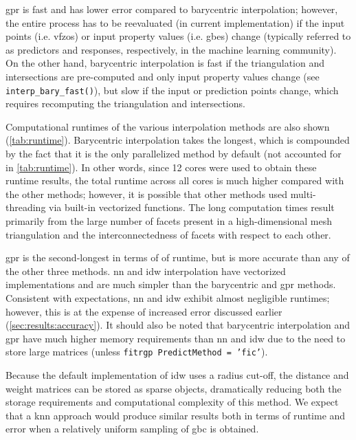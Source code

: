 \documentclass[final,twocolumn,12pt]{elsarticle}
\newcommand{\inpt}{input}
\newcommand{\outpt}{prediction}
\begin{document}

\Gls{gpr} is fast and has lower error compared to barycentric interpolation; however, the entire process has to be reevaluated (in current implementation) if the input points (i.e. \glspl{vfzo}) or input property values (i.e. \glspl{gbe}) change
(typically referred to as predictors and responses, respectively, in the machine learning community).
On the other hand, barycentric interpolation is fast if the triangulation and intersections are pre-computed and only input property values change (see \texttt{interp\_bary\_fast()}), but slow if the \inpt{} or \outpt{} points change, which requires recomputing the triangulation and intersections.

Computational runtimes of the various interpolation methods are also shown (\cref{tab:runtime}). Barycentric interpolation takes the longest, which is compounded by the fact that it is the only parallelized method by default (not accounted for in \cref{tab:runtime}). In other words, since 12 cores were used to obtain these runtime results, the total runtime across all cores is much higher compared with the other methods; however, it is possible that other methods used multi-threading via built-in vectorized functions. The long computation times result primarily from the large number of facets present in a high-dimensional mesh triangulation and the interconnectedness of facets with respect to each other.

\Gls{gpr} is the second-longest in terms of of runtime, but is more accurate than any of the other three methods. \Gls{nn} and \gls{idw} interpolation have vectorized implementations and are much simpler than the barycentric and \gls{gpr} methods. Consistent with expectations, \gls{nn} and \gls{idw} exhibit almost negligible runtimes; however, this is at the expense of increased error discussed earlier (\cref{sec:results:accuracy}). It should also be noted that barycentric interpolation and \gls{gpr} have much higher memory requirements than \gls{nn} and \gls{idw} due to the need to store large matrices (unless \texttt{fitrgp PredictMethod = 'fic'}).

Because the default implementation of \gls{idw} uses a radius cut-off, the distance and weight matrices can be stored as sparse objects, dramatically reducing both the storage requirements and computational complexity of this method. We expect that a \gls{knn} approach would produce similar results both in terms of runtime and error when a relatively uniform sampling of \gls{gbc} is obtained.
\end{document}

